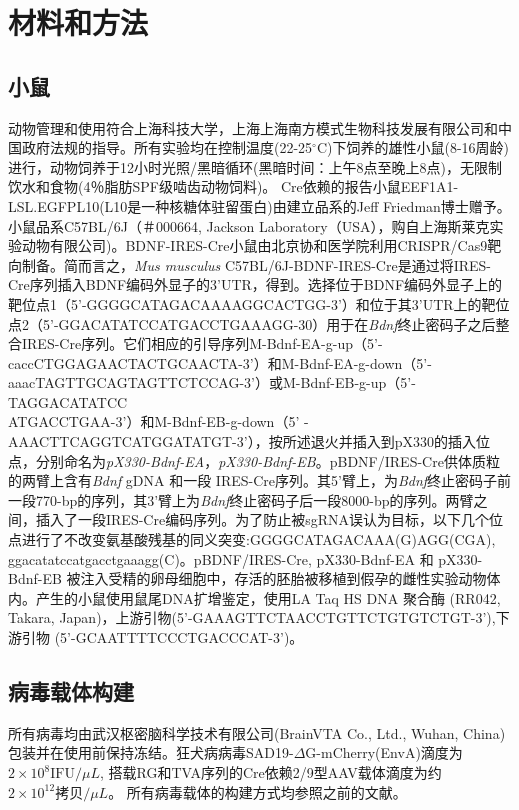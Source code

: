 \chapter{材料和方法}

\section{小鼠}
动物管理和使用符合上海科技大学，上海上海南方模式生物科技发展有限公司和中国政府法规的指导。所有实验均在控制温度(22-25$^\circ$C)下饲养的雄性小鼠(8-16周龄)进行，动物饲养于12小时光照/黑暗循环(黑暗时间：上午8点至晚上8点)，无限制饮水和食物(4％脂肪SPF级啮齿动物饲料)。
Cre依赖的报告小鼠EEF1A1-LSL.EGFPL10(L10是一种核糖体驻留蛋白)\citep{stanley2013profiling}由建立品系的Jeff Friedman博士赠予。小鼠品系C57BL/6J（＃000664, Jackson Laboratory（USA），购自上海斯莱克实验动物有限公司)。BDNF-IRES-Cre小鼠由北京协和医学院利用CRISPR/Cas9靶向制备。简而言之，\textit{Mus musculus} C57BL/6J-BDNF-IRES-Cre是通过将IRES-Cre序列插入BDNF编码外显子的3'UTR，得到。选择位于BDNF编码外显子上的靶位点1（5'-GGGGCATAGACAAAAGGCACTGG-3'）和位于其3'UTR上的靶位点2（5'-GGACATATCCATGACCTGAAAGG-30）用于在\textit{Bdnf}终止密码子之后整合IRES-Cre序列。它们相应的引导序列M-Bdnf-EA-g-up（5'-caccCTGGAGAACTACTGCAACTA-3'）和M-Bdnf-EA-g-down（5'-aaacTAGTTGCAGTAGTTCTCCAG-3'）或M-Bdnf-EB-g-up（5'-TAGGACATATCC\\ATGACCTGAA-3'）和M-Bdnf-EB-g-down（5' -AAACTTCAGGTCATGGATATGT-3'），按\citep{mizuno2014simple}所述退火并插入到pX330的插入位点，分别命名为\textit{pX330-Bdnf-EA}，\textit{pX330-Bdnf-EB}。pBDNF/IRES-Cre供体质粒的两臂上含有\textit{Bdnf} gDNA 和一段 IRES-Cre序列。其5'臂上，为\textit{Bdnf}终止密码子前一段770-bp的序列，其3'臂上为\textit{Bdnf}终止密码子后一段8000-bp的序列。两臂之间，插入了一段IRES-Cre编码序列。为了防止被sgRNA误认为目标，以下几个位点进行了不改变氨基酸残基的同义突变:GGGGCATAGACAAA(G)AGG(CGA), ggacatatccatgacctgaaagg(C)。pBDNF/IRES-Cre, pX330-Bdnf-EA 和 pX330-Bdnf-EB 被注入受精的卵母细胞中，存活的胚胎被移植到假孕的雌性实验动物体内。产生的小鼠使用鼠尾DNA扩增鉴定，使用LA Taq HS DNA 聚合酶 (RR042, Takara, Japan)，上游引物(5'-GAAAGTTCTAACCTGTTCTGTGTCTGT-3'),下游引物 (5'-GCAATTTTCCCTGACCCAT-3')。

\section{病毒载体构建}
所有病毒均由武汉枢密脑科学技术有限公司(BrainVTA Co., Ltd., Wuhan, China)包装并在使用前保持冻结。狂犬病病毒SAD19-$\Delta$G-mCherry(EnvA)滴度为$2 \times 10^8 \text{IFU}/\mu L$, 搭载RG和TVA序列的Cre依赖2/9型AAV载体滴度为约$2 \times 10^12 \text{拷贝}/\mu L$。 所有病毒载体的构建方式均参照之前的文献\citep{zhang2017whole}。

